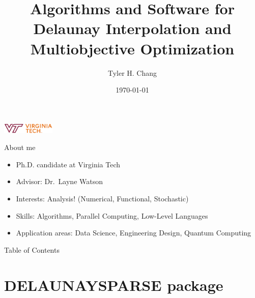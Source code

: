 \documentclass[xcolor=dvipsnames]{beamer}
\title{Algorithms and Software for Delaunay Interpolation and
Multiobjective Optimization}
\date{\today}
\author{Tyler H. Chang}
\institute{Dept. of Computer Science \\
Virginia Polytechnic Institute and State University}
\begin{document}
\begin{frame}[plain] %
\vfill
\titlepage
\vfil %
\centerline{\includegraphics[height=0.5cm]{VPIlogo.png}}
\end{frame}

\begin{frame}{About me}
\begin{itemize}
\item Ph.D. candidate at Virginia Tech
\item Advisor: Dr.\ Layne Watson
\item Interests: Analysis! (Numerical, Functional, Stochastic)
\item Skills: Algorithms, Parallel Computing, Low-Level Languages
\item Application areas: Data Science, Engineering Design, Quantum Computing
\end{itemize}
\end{frame}
\begin{frame}{Table of Contents}
\tableofcontents
\end{frame}
\section{DELAUNAYSPARSE package}
\end{document}
